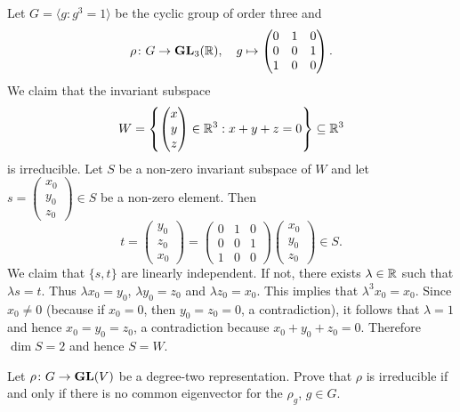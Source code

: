 \begin{example}
        Let $G=\langle g:g^3=1\rangle$ be the
    cyclic group of order three
    and
    \[
    \rho\colon G\to\mathbf{GL}_3(\mathbb{R}),
    \quad
    g\mapsto\begin{pmatrix}
        0&1&0\\
        0&0&1\\
        1&0&0
    \end{pmatrix}.
    \]
    We claim that the invariant subspace
    \[
    W=\left\{
    \begin{pmatrix}
    x\\
    y\\
    z
    \end{pmatrix}\in\mathbb{R}^3:x+y+z=0\right\}\subseteq\mathbb{R}^3
    \]
    is irreducible. Let $S$ be a non-zero invariant subspace of $W$ and let $s=\begin{pmatrix}x_0\\y_0\\z_0\end{pmatrix}\in S$ be a non-zero element. Then
    \[
    t=\begin{pmatrix}y_0\\z_0\\x_0\end{pmatrix}
    =\begin{pmatrix}
        0&1&0\\
        0&0&1\\
        1&0&0
    \end{pmatrix}
    \begin{pmatrix}x_0\\y_0\\z_0\end{pmatrix}\in S.
    \]
    We claim that $\{s,t\}$ are linearly independent. If not, there exists $\lambda\in\mathbb{R}$ such that
    $\lambda s=t$. Thus $\lambda x_0=y_0$, $\lambda y_0=z_0$ and $\lambda z_0=x_0$. This implies that
    $\lambda^3x_0=x_0$. Since $x_0\ne 0$ (because if $x_0=0$, then $y_0=z_0=0$, a contradiction), it follows that
    $\lambda=1$ and hence $x_0=y_0=z_0$, a contradiction because $x_0+y_0+z_0=0$.
    Therefore $\dim S=2$ and hence $S=W$.
\end{example}

\begin{exercise}
    Let $\rho\colon G\to\mathbf{GL}(V)$ be a degree-two representation. Prove that
    $\rho$ is irreducible if and only if there is no common eigenvector for the $\rho_g$, $g\in G$.
\end{exercise}

